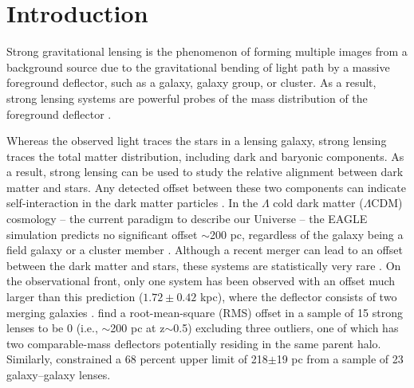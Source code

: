\documentclass{aa}
\begin{document}

   \maketitle
%

\section{Introduction}

Strong gravitational lensing is the phenomenon of forming multiple images from a background source due to the gravitational bending of light path by a massive foreground deflector, such as a galaxy, galaxy group, or cluster. As a result, strong lensing systems are powerful probes of the mass distribution of the foreground deflector \citep[see][for a review on strong lensing by galaxies]{Shajib22}.

Whereas the observed light traces the stars in a lensing galaxy, strong lensing traces the total matter distribution, including dark and baryonic components. As a result, strong lensing can be used to study the relative alignment between dark matter and stars. Any detected offset between these two components can indicate self-interaction in the dark matter particles \citep{Harvey14, Kahlhoefer14, Robertson17}. In the $\Lambda$ cold dark matter ($\Lambda$CDM) cosmology -- the current paradigm to describe our Universe -- the EAGLE simulation predicts no significant offset $\sim$200 pc, regardless of the galaxy being a field galaxy or a cluster member \citep{Schaller15}. Although a recent merger can lead to an offset between the dark matter and stars, these systems are statistically very rare \citep{Schaller15}. On the observational front, only one system has been observed with an offset much larger than this prediction ($1.72\pm 0.42$ kpc), where the deflector consists of two merging galaxies  \citep[][]{Shu16}. %
\citet{Shajib19} find a root-mean-square (RMS) offset in a sample of 15 strong lenses to be 0 (i.e., $\sim$200 pc at z$\sim$0.5) excluding three outliers, one of which has two comparable-mass deflectors potentially residing in the same parent halo. Similarly, \citet{Shajib21} constrained a 68 percent upper limit of 218$\pm$19 pc from a sample of 23 galaxy--galaxy lenses.
\end{document}
